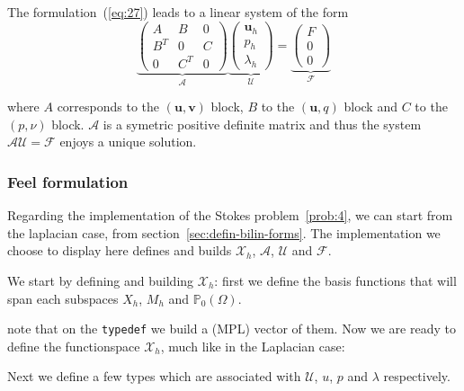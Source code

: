 \documentclass[a4paper]{book}
\begin{document}
The formulation~(\ref{eq:27}) leads to a linear system of the form
\begin{equation}
  \label{eq:28}
  \underbrace{\begin{pmatrix}
    A & B & 0\\
    B^T & 0 & C\\
    0 & C^T & 0
  \end{pmatrix}}_{\mathcal{A}}
\underbrace{
  \begin{pmatrix}
    \mathbf{u}_h\\
    p_h\\
    \lambda_h
  \end{pmatrix}}_{\mathcal{U}} =
\underbrace{\begin{pmatrix}
    F\\
    0\\
    0
  \end{pmatrix}}_{\mathcal{F}}
\end{equation}

where $A$ corresponds to the $(\mathbf{u},\mathbf{v})$ block, $B$ to
the $(\mathbf{u},q)$ block and $C$ to the $(p,\nu)$
block. $\mathcal{A}$ is a symetric positive definite matrix and thus
the system $\mathcal{A} \mathcal{U} = \mathcal{F}$ enjoys a unique
solution.

\subsubsection{Feel formulation}
\label{sec:feel-formulation}

Regarding the implementation of the Stokes problem~\ref{prob:4}, we
can start from the laplacian case, from
section~\ref{sec:defin-bilin-forms}. The implementation we choose to
display here defines and builds $\mathcal{X}_h$, $\mathcal{A}$,
$\mathcal{U}$ and $\mathcal{F}$.

We start by defining and building $\mathcal{X}_h$: first we define the
basis functions that will span each subspaces $X_h$, $M_h$ and
$\mathbb{P}_0(\Omega)$.



note that on the \lstinline!typedef! we build a (MPL) vector of them. Now we are
ready to define the functionspace $\mathcal{X}_h$, much like in the
Laplacian case:



Next we define a few types which are associated with $\mathcal{U}$,
$u$, $p$ and $\lambda$ respectively.
\end{document}
